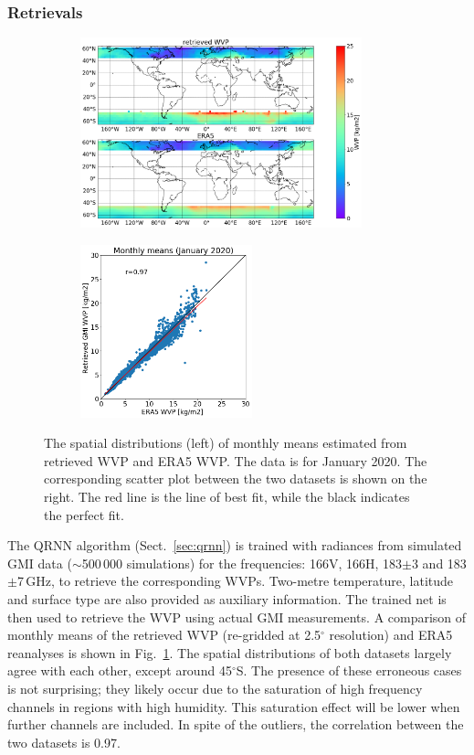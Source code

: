 \documentclass[12pt,oneside,a4paper]{article}
\begin{document}
\subsubsection{Retrievals}
\label{sec:preliminary_results}
\begin{figure}[t]
	\centering
	\begin{subfigure}{.54\textwidth}
		\includegraphics[height = 55mm]{Figures/WVP_spatial_jan2020.png}
	\end{subfigure}
	\begin{subfigure}{.34\textwidth}
	\includegraphics[height = 50mm]{Figures/WVP_scatter_monthlymean.png} 
	\end{subfigure}
	\caption{The spatial distributions (left) of monthly means estimated from retrieved WVP and ERA5 WVP. The data is for January 2020. The corresponding scatter plot between the two datasets is shown on the right. The red line is the line of best fit, while the black indicates the perfect fit.}
	\label{fig:WVP_retrievals}
\end{figure}

The QRNN algorithm (Sect.~\ref{sec:qrnn}) is trained with radiances from
simulated GMI data ($\sim$500\,000 simulations) for the frequencies: 166V,
166H, 183$\pm$3 and 183$\pm$7\,GHz, to retrieve the corresponding WVPs.
Two-metre temperature, latitude and surface type are also provided as auxiliary
information. The trained net is then used to retrieve the WVP using actual GMI
measurements. A comparison of monthly means of the retrieved WVP (re-gridded at
2.5$^{\circ}$ resolution) and ERA5 reanalyses is shown in
Fig.~\ref{fig:WVP_retrievals}. The spatial distributions of both datasets
largely agree with each other, except around 45$^{\circ}$S. The presence of
these erroneous cases is not surprising; they likely occur due to the
saturation of high frequency channels in regions with high humidity. This
saturation effect will be lower when further channels are included. In spite of
the outliers, the correlation between the two datasets is 0.97.
\end{document}
